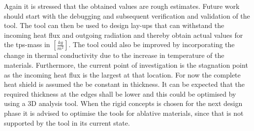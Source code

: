 Again it is stressed that the obtained values are rough estimates. Future work should start with the debugging and subsequent verification and validation of the tool. The tool can then be used to design lay-ups that can withstand the incoming heat flux and outgoing radiation and thereby obtain actual values for the \gls{tps}-mass in $\left[\frac{kg}{m^2}\right]$. The tool could also be improved by incorporating the change in thermal conductivity due to the increase in temperature of the materials. Furthermore, the current point of investigation is the stagnation point as the incoming heat flux is the largest at that location. For now the complete heat shield is assumed the be constant in thickness. It can be expected that the required thickness at the edges shall be lower and this could be optimised by using a 3D analysis tool. When the rigid concepts is chosen for the next design phase it is advised to optimise the tools for ablative materials, since that is not supported by the tool in its current state.


